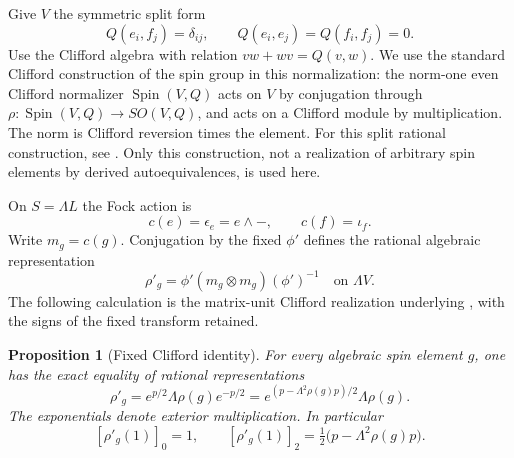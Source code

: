 \documentclass[11pt]{article}
\newtheorem{proposition}[theorem]{Proposition}
\numberwithin{equation}{section}
\begin{document}
Give \(V\) the symmetric split form
\[
 Q(e_i,f_j)=\delta_{ij},\qquad Q(e_i,e_j)=Q(f_i,f_j)=0.
\]
Use the Clifford algebra with relation \(vw+wv=Q(v,w)\).
We use the standard Clifford construction of the spin group in this
normalization: the norm-one even Clifford normalizer
\(\operatorname{Spin}(V,Q)\) acts on \(V\) by conjugation through
\(\rho:\operatorname{Spin}(V,Q)\to SO(V,Q)\), and acts on a Clifford
module by multiplication.  The norm is Clifford reversion times the
element.  For this split rational construction, see
\cite[Sections~3.2 and~3.4--3.5]{GolyshevLuntsOrlov2001}.
Only this construction, not a realization of arbitrary spin elements
by derived autoequivalences, is used here.

On \(S=\Lambda L\) the Fock action is
\[
 c(e)=\epsilon_e=e\wedge-,\qquad c(f)=\iota_f.
\]
Write \(m_g=c(g)\).  Conjugation by the fixed \(\phi'\) defines the
rational algebraic representation
\[
 \rho'_g=\phi'(m_g\otimes m_g)(\phi')^{-1}
       \quad\text{on }\Lambda V.
\]
The following calculation is the matrix-unit Clifford realization
underlying \cite[Proposition~3.2.1(e)]{GolyshevLuntsOrlov2001},
with the signs of the fixed transform retained.

\begin{proposition}[Fixed Clifford identity]
\label{p3sw:spin-identity}
For every algebraic spin element \(g\), one has the exact equality
of rational representations
\begin{equation}
\label{p3sw:spin-eq:identity}
 \rho'_g=e^{p/2}\Lambda\rho(g)e^{-p/2}
       =e^{(p-\Lambda^2\rho(g)p)/2}\Lambda\rho(g).
\end{equation}
The exponentials denote exterior multiplication.  In particular
\[
 [\rho'_g(1)]_0=1,\qquad
 [\rho'_g(1)]_2=\tfrac12\bigl(p-\Lambda^2\rho(g)p\bigr).
\]
\end{proposition}
\end{document}
